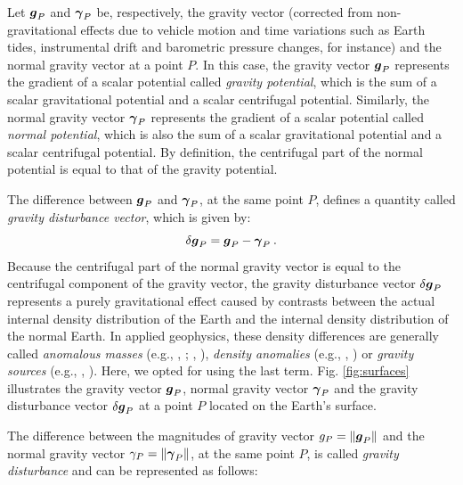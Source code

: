 \documentclass[extra]{gji}
\begin{document}
Let $\mitbf{g}_{P}$ and $\mitbf{\gamma}_{P}$ be, respectively, the
gravity vector (corrected from non-gravitational effects due to vehicle
motion and time variations such as Earth tides, instrumental drift and
barometric pressure changes, for instance) and the normal gravity vector
at a point $P$.
In this case, the gravity vector $\mitbf{g}_{P}$ represents the
gradient of a scalar potential called \textit{gravity potential},
which is the sum of a scalar gravitational potential and a
scalar centrifugal potential.
Similarly, the normal gravity vector $\mitbf{\gamma}_{P}$ represents the
gradient of a scalar potential called \textit{normal potential},
which is also the sum of a scalar gravitational potential and a
scalar centrifugal potential.
By definition, the centrifugal part of the normal potential is equal
to that of the gravity potential.

The difference between $\mitbf{g}_{P}$ and $\mitbf{\gamma}_{P}$, at the same
point $P$, defines a quantity called \textit{gravity disturbance
vector}, which is given by:
\begin{equation}
\delta \mitbf{g}_{P} =
\mitbf{g}_{P} - \mitbf{\gamma}_{P} \: .
\label{eq:gravity-disturbance-vector}
\end{equation}
Because the centrifugal part of the normal gravity vector
is equal to the centrifugal component of the gravity vector,
the gravity disturbance vector $\delta \mitbf{g}_{P}$ represents
a purely gravitational effect caused by contrasts between the actual internal
density distribution of the Earth and the internal density
distribution of the normal Earth.
In applied geophysics, these density differences are generally
called \textit{anomalous masses} (e.g., \citeauthor{hammer1945},
\citeyear{hammer1945}; \citeauthor{lafehr1965}, \citeyear{lafehr1965}),
\textit{density anomalies} (e.g., \citeauthor{forsberg1984},
\citeyear{forsberg1984}) or \textit{gravity sources} (e.g.,
\citeauthor{blakely1996}, \citeyear{blakely1996}). Here, we opted for
using the last term.
Fig. \ref{fig:surfaces} illustrates the gravity vector
$\mitbf{g}_{P}$, normal gravity vector $\mitbf{\gamma}_{P}$ and
the gravity disturbance vector $\delta \mitbf{g}_{P}$ at a point $P$
located on the Earth's surface.

The difference between the magnitudes of gravity vector
$g_{P} = \| \mitbf{g}_{P} \|$ and the normal gravity vector
$\gamma_{P} = \| \mitbf{\gamma}_{P} \|$, at the
same point $P$, is called \textit{gravity disturbance}
\citep{heiskanen-moritz1967, hofmann-wellenhof-moritz2005}
and can be represented as follows:
\end{document}
